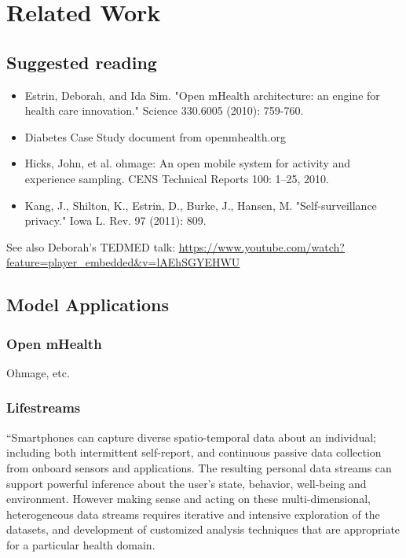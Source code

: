 \section{Related Work}


\subsection{Suggested reading}

\begin{itemize}
\item Estrin, Deborah, and Ida Sim. "Open mHealth architecture: an engine for health care innovation." Science 330.6005 (2010): 759-760.

\item Diabetes Case Study document from openmhealth.org 

\item Hicks, John, et al. ohmage: An open mobile system for activity and experience sampling. CENS Technical Reports 100: 1–25, 2010.

\item Kang, J., Shilton, K., Estrin, D., Burke, J., Hansen, M. "Self-surveillance privacy." Iowa L. Rev. 97 (2011): 809.
\end{itemize} 

See also Deborah's TEDMED talk: 
\url{https://www.youtube.com/watch?feature=player_embedded&v=lAEhSGYEHWU}


\subsection{Model Applications}

\subsubsection{Open mHealth}
Ohmage, etc.

\subsubsection{Lifestreams}

``Smartphones can capture diverse spatio-temporal data about an individual; including both intermittent self-report, and continuous passive data collection from onboard sensors and applications. The resulting personal data streams can support powerful inference about the user's state, behavior, well-being and environment. However making sense and acting on these multi-dimensional, heterogeneous data streams requires iterative and intensive exploration of the datasets, and development of customized analysis techniques that are appropriate for a particular health domain.

